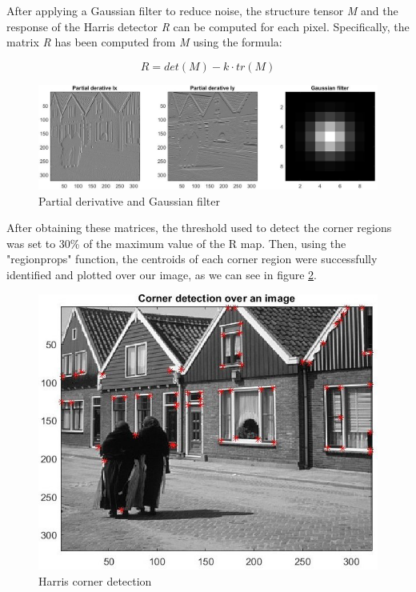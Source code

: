After applying a Gaussian filter to reduce noise, the structure tensor \textit{M} and the response of the Harris detector \textit{R} can be computed for each pixel. Specifically, the matrix \textit{R} has been computed from \textit{M} using the formula:

\begin{equation}
	R = det(M) - k \cdot tr(M)
\end{equation}

\begin{figure}[h]
	\centering
	\includegraphics[width=\linewidth]{"mainmatter/Images/partial derivative and gaussian filter"}
	\caption{Partial derivative and Gaussian filter}
	\label{fig:partial-derivative-and-gaussian-filter}
\end{figure}

After obtaining these matrices, the threshold used to detect the corner regions was set to 30\% of the maximum value of the R map. Then, using the "regionprops" function, the centroids of each corner region were successfully identified and plotted over our image, as we can see in figure \ref{fig:corner-detection-over-image}. 

\begin{figure}
	\centering
	\includegraphics[width=0.7\linewidth]{"mainmatter/Images/Corner detection over image"}
	\caption{Harris corner detection}
	\label{fig:corner-detection-over-image}
\end{figure}



